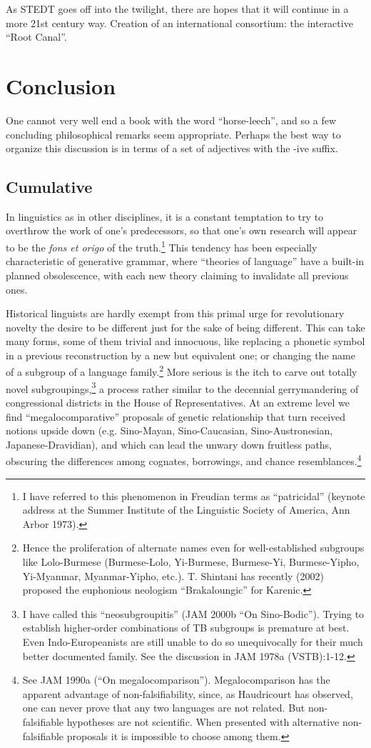 As STEDT goes off into the twilight, there are hopes that it will continue in a more 21st century way.  Creation of an international consortium: the interactive “Root Canal”.

\section{Conclusion}
One cannot very well end a book with the word ``horse-leech'', and so a few concluding philosophical remarks seem appropriate. Perhaps the best way to organize this discussion is in terms of a set of adjectives with the -ive suffix.
\subsection{Cumulative}
In linguistics as in other disciplines, it is a constant temptation to try to overthrow the work of one's predecessors, so that one's own research will appear to be the {\it fons et origo} of the truth.\footnote{I have referred to this phenomenon in Freudian terms as ``patricidal'' (keynote address at the Summer Institute of the Linguistic Society of America, Ann Arbor 1973).}
This tendency has been especially characteristic of generative grammar, where ``theories of language'' have a built-in planned obsolescence, with each new theory claiming to invalidate all previous ones.

Historical linguists are hardly exempt from this primal urge for revolutionary novelty  the desire to be different just for the sake of being different. This can take many forms, some of them trivial and innocuous, like replacing a phonetic symbol in a previous reconstruction by a new but equivalent one; or changing the name of a subgroup of a language family.\footnote{Hence the proliferation of alternate names even for well-established subgroups like Lolo-Burmese (Burmese-Lolo, Yi-Burmese, Burmese-Yi, Burmese-Yipho, Yi-Myanmar, Myanmar-Yipho, etc.). T. Shintani has recently (2002) proposed the euphonious neologism ``Brakaloungic'' for Karenic.}
More serious is the itch to carve out totally novel subgroupings,\footnote{I have called this ``neosubgroupitis'' (JAM 2000b ``On Sino-Bodic''). Trying to establish higher-order combinations of TB subgroups is premature at best. Even Indo-Europeanists are still unable to do so unequivocally for their much better documented family. See the discussion in JAM 1978a (VSTB):1-12.} a process rather similar to the decennial gerrymandering of congressional districts in the House of Representatives. At an extreme level we find ``megalocomparative'' proposals of genetic relationship that turn received notions upside down (e.g. Sino-Mayan, Sino-Caucasian, Sino-Austronesian, Japanese-Dravidian), and which can lead the unwary down fruitless paths, obscuring the differences among cognates, borrowings, and chance resemblances.\footnote{See JAM 1990a (“On megalocomparison”). Megalocomparison has the apparent advantage of non-falsifiability, since, as Haudricourt has observed, one can never prove that any two languages are not related. But non-falsifiable hypotheses are not scientific. When presented with alternative non-falsifiable proposals it is impossible to choose among them.}

